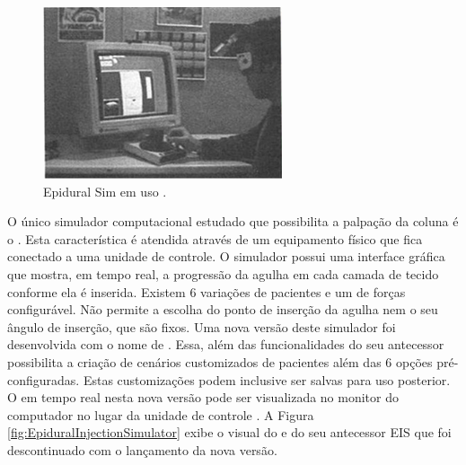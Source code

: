 \begin{figure}[ht!]
    \centering
    \includegraphics[width=0.3\linewidth]{capitulos/figuras/epiduralSimulator.png} 
    \caption{Epidural Sim em uso \cite{Stredney1996}.}
    \label{fig:epiduralSim}
\end{figure}

O único simulador computacional estudado que possibilita a palpação da coluna é o  \cite{Wilson2003}. Esta característica é atendida através de um equipamento físico que fica conectado a uma unidade de controle. O simulador possui uma interface gráfica que mostra, em tempo real, a progressão da agulha em cada camada de tecido conforme ela é inserida. Existem 6 variações de pacientes e um  de forças configurável. Não permite a escolha do ponto de inserção da agulha nem o seu ângulo de inserção, que são fixos. Uma nova versão deste simulador foi desenvolvida com o nome de . Essa, além das funcionalidades do seu antecessor possibilita a criação de cenários customizados de pacientes além das 6 opções pré-configuradas. Estas customizações podem inclusive ser salvas para uso posterior. O  em tempo real nesta nova versão pode ser visualizada no monitor do computador no lugar da unidade de controle \cite{CPRSavers&FirstAidSupply2018}. A Figura \ref{fig:EpiduralInjectionSimulator} exibe o visual do  e do seu antecessor EIS que foi descontinuado com o lançamento da nova versão.

